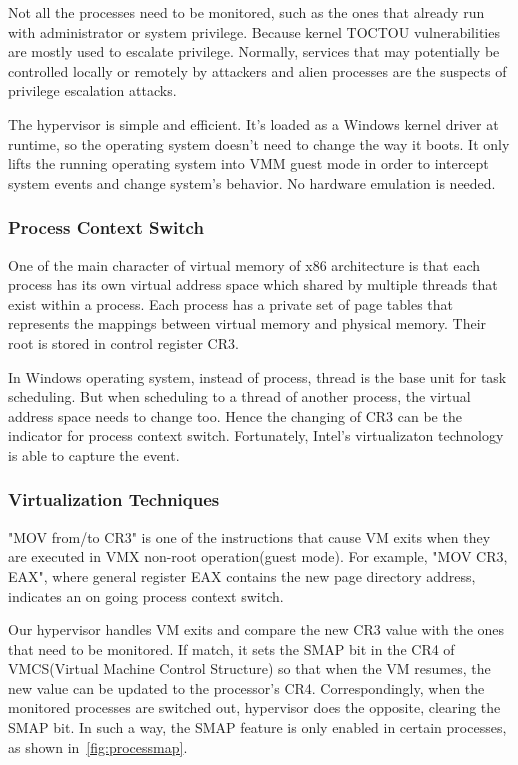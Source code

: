 Not all the processes need to be monitored, such as the ones that already run with administrator or system privilege. Because kernel TOCTOU vulnerabilities are mostly used to escalate privilege. Normally, services that may potentially be controlled locally or remotely by attackers and alien processes are the suspects of privilege escalation attacks.

The hypervisor is simple and efficient. It's loaded as a Windows kernel driver at runtime, so the operating system doesn't need to change the way it boots. It only lifts the running operating system into VMM guest mode in order to intercept system events and change system's behavior. No hardware emulation is needed.  

\subsubsection{Process Context Switch}

One of the main character of virtual memory of x86 architecture is that each process has its own virtual address space which shared by multiple threads that exist within a process. Each process has a private set of page tables that represents the mappings between virtual memory and physical memory. Their root is stored in control register CR3. 

In Windows operating system, instead of process, thread is the base unit for task scheduling. But when scheduling to a thread of another process, the virtual address space needs to change too. Hence the changing of CR3 can be the indicator for process context switch. Fortunately, Intel's virtualizaton technology is able to capture the event.


\subsubsection{Virtualization Techniques}

"MOV from/to CR3" is one of the instructions that cause VM exits when they are executed in VMX non-root operation(guest mode). For example, "MOV CR3, EAX", where general register EAX contains the new page directory address, indicates an on going process context switch.

Our hypervisor handles VM exits and compare the new CR3 value with the ones that need to be monitored. If match, it sets the SMAP bit in the CR4 of VMCS(Virtual Machine Control Structure) so that when the VM resumes, the new value can be updated to the processor's CR4. Correspondingly, when the monitored processes are switched out, hypervisor does the opposite, clearing the SMAP bit. In such a way, the SMAP feature is only enabled in certain processes, as shown in~\autoref{fig:processmap}.


